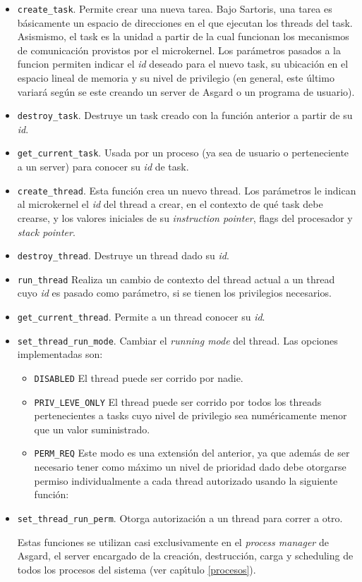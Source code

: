 \documentclass[11pt, letterpaper, twoside]{book}
\begin{document}
\begin{itemize}

\item[] \texttt{create\_task}. Permite crear una nueva tarea. Bajo Sartoris, una tarea es b\'asicamente un espacio de direcciones en el que ejecutan los threads del task. Asismismo, el task es la unidad a partir de la cual funcionan los mecanismos de comunicaci\'on provistos por el microkernel. Los par\'ametros pasados a la funcion permiten indicar el \emph{id} deseado para el nuevo task, su ubicaci\'on en el espacio lineal de memoria y su nivel de privilegio (en general, este \'ultimo variar\'a seg\'un se este creando un server de Asgard o un programa de usuario).
\item[] \texttt{destroy\_task}. Destruye un task creado con la funci\'on anterior a partir de su \emph{id}.
\item[] \texttt{get\_current\_task}. Usada por un proceso (ya sea de usuario o perteneciente a un server) para conocer su \emph{id} de task.
\item[] \texttt{create\_thread}. Esta funci\'on crea un nuevo thread. Los par\'ametros le indican al microkernel el \emph{id} del thread a crear, en el contexto de qu\'e task debe crearse, y los valores iniciales de su \emph{instruction pointer}, flags del procesador y \emph{stack pointer}.
\item[] \texttt{destroy\_thread}. Destruye un thread dado su \emph{id}.
\item[] \texttt{run\_thread} Realiza un cambio de contexto del thread actual a un thread cuyo \emph{id} es pasado como par\'ametro, si se tienen los privilegios necesarios.
\item[] \texttt{get\_current\_thread}. Permite a un thread conocer su \emph{id}.
\item[] \texttt{set\_thread\_run\_mode}. Cambiar el \emph{running mode} del thread. Las opciones implementadas son:
\begin{itemize}
\item[] \texttt{DISABLED} El thread puede ser corrido por nadie.
\item[] \texttt{PRIV\_LEVE\_ONLY} El thread puede ser corrido por todos los threads pertenecientes a tasks cuyo nivel de privilegio sea num\'ericamente menor que un valor suministrado.
\item[] \texttt{PERM\_REQ} Este modo es una extensi\'on del anterior, ya que adem\'as de ser necesario tener como m\'aximo un nivel de prioridad dado debe otorgarse permiso individualmente a cada thread autorizado usando la siguiente funci\'on:
\end{itemize}
\item[] \texttt{set\_thread\_run\_perm}. Otorga autorizaci\'on a un thread para correr a otro.

Estas funciones se utilizan casi exclusivamente en el \emph{process manager} de Asgard, el server encargado de la creaci\'on, destrucci\'on, carga y scheduling de todos los procesos del sistema (ver cap\'\i{}tulo \ref{procesos}).

\end{itemize}
\end{document}
